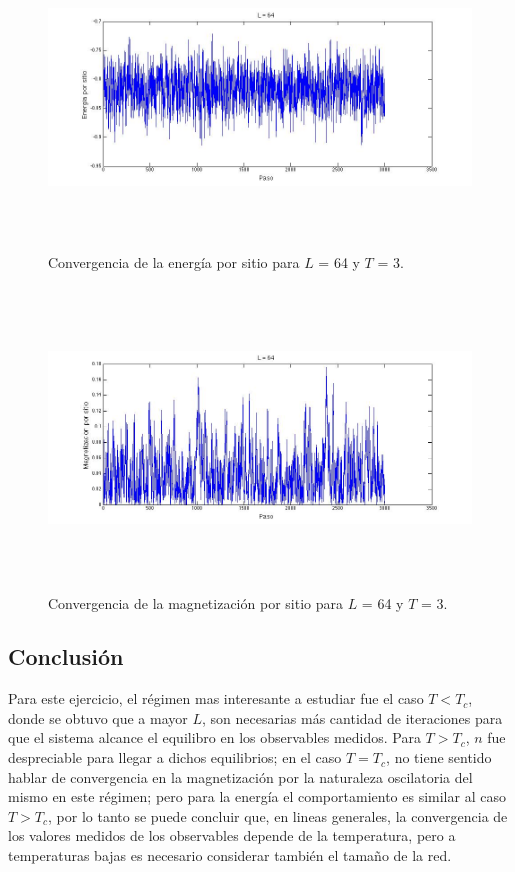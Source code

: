 \documentclass[a4paper,12pt]{article}
\begin{document}
\begin{figure}[H]
\begin{center}
\includegraphics[height=8cm]{../graficos/En_L64_T3.jpg}
\caption[width=5cm]{Convergencia de la energ\'ia por sitio para $L$ = 64 y $T$ = 3.}
\end{center}
\end{figure}

\begin{figure}[H]
\begin{center}
\includegraphics[height=8cm]{../graficos/Mag_L64_T3.jpg}
\caption[width=5cm]{Convergencia de la magnetizaci\'on por sitio para $L$ = 64 y $T$ = 3.}
\end{center}
\end{figure}


\subsection{Conclusi\'on}

Para este ejercicio, el r\'egimen mas interesante a estudiar fue el caso $T < T_{c}$, donde se obtuvo que a mayor $L$, son necesarias m\'as cantidad de iteraciones para que el sistema alcance el equilibro en los observables medidos. Para $T > T_{c}$, $n$ fue despreciable para llegar a dichos equilibrios; en el caso $T = T_{c}$, no tiene sentido hablar de convergencia en la magnetizaci\'on por la naturaleza oscilatoria del mismo en este r\'egimen; pero para la energ\'ia el comportamiento es similar al caso $T > T_{c}$, por lo tanto se puede concluir que, en lineas generales, la convergencia de los valores medidos de los observables depende de la temperatura, pero a temperaturas bajas es necesario considerar tambi\'en el tama\~no de la red.
\end{document}
